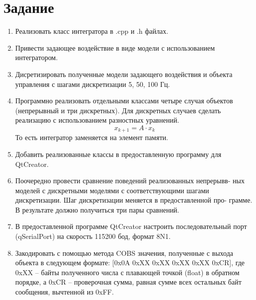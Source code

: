 \documentclass[14pt,a4paper]{extreport}
\begin{document}


\newpage
\tableofcontents

\chapter*{Задание}

\begin{enumerate}
\item
Реализовать класс интегратора в .cpp и .h файлах.
    
\item 
Привести задающее воздействие в виде модели с использованием интегратором.
    
\item 
Дисретизировать полученные модели задающего воздействия 
и объекта управления с шагами дискретизации 5, 50, 100 Гц.

\item
Программно реализовать отдельными классами четыре случая объектов 
(непрерывный и три дискретных). Для дискретных случаев сделать 
реализацию с использованием разностных уравнений.
\begin{equation} 
    x_{k+1} = A \cdot x_k
\end{equation}
То есть интегратор заменяется на элемент памяти.

\item 
Добавить реализованные классы в предоставленную программу для \\ QtCreator.

\item
Поочередно провести сравнение поведений реализованных непрерывв-
ных моделей с дискретными моделями с соответствующими шагами
дискретизации. Шаг дискретизации меняется в предоставленной про-
грамме. В результате должно получиться три пары сравнений.

\item 
В предоставленной программе QtCreator настроить последовательный
порт (qSerialPort) на скорость 115200 бод, формат 8N1.

\item 
Закодировать с помощью метода COBS значения, полученные с выхода
объекта в следующем формате:
{[0x0A 0xXX 0xXX 0xXX 0xXX 0xCR]}, где 0xXX – байты полученного 
числа с плавающей точкой (float) в
обратном порядке, а 0xCR – проверочная сумма, равная сумме всех
остальных байт сообщения, вычтенной из 0xFF.

\end{enumerate}
\end{document}
